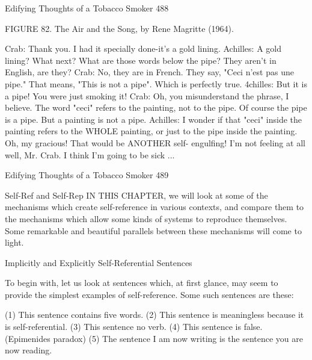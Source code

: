 {Edifying Thoughts of a Tobacco Smoker                                                      488

              FIGURE 82. The Air and the Song, by Rene Magritte (1964).

Crab: Thank you. I had it specially done-it's a gold lining.
Achilles: A gold lining? What next? What are those words below the pipe? They aren't in
  English, are they?
Crab: No, they are in French. They say, "Ceci n'est pas une pipe." That means, "This is
  not a pipe". Which is perfectly true. 4chilles: But it is a pipe! You were just smoking
  it!
Crab: Oh, you misunderstand the phrase, I believe. The word "ceci" refers to the painting,
  not to the pipe. Of course the pipe is a pipe. But a painting is not a pipe.
Achilles: I wonder if that "ceci" inside the painting refers to the WHOLE painting, or just
  to the pipe inside the painting. Oh, my gracious! That would be ANOTHER self-
  engulfing! I'm not feeling at all well, Mr. Crab. I think I'm going to be sick ...




Edifying Thoughts of a Tobacco Smoker                                                  489


                                  Self-Ref and Self-Rep
IN THIS CHAPTER, we will look at some of the mechanisms which create self-reference in
various contexts, and compare them to the mechanisms which allow some kinds of systems
to reproduce themselves. Some remarkable and beautiful parallels between these mechanisms
will come to light.

                    Implicitly and Explicitly Self-Referential Sentences

To begin with, let us look at sentences which, at first glance, may seem to provide the
simplest examples of self-reference. Some such sentences are these:

       (1) This sentence contains five words.
       (2) This sentence is meaningless because it is self-referential.
       (3) This sentence no verb.
       (4) This sentence is false. (Epimenides paradox)
       (5) The sentence I am now writing is the sentence you are now reading.

}
